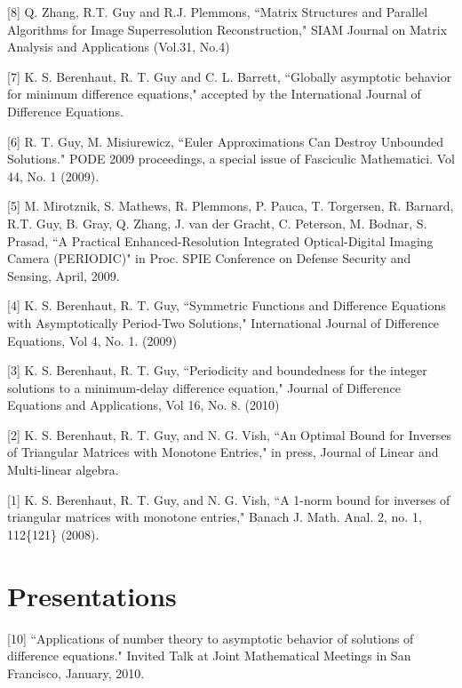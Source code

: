 \documentclass[overlapped,line,letterpaper]{res}
\begin{document}
\begin{resume}


[8] Q. Zhang, R.T. Guy and R.J. Plemmons, ``Matrix Structures and Parallel Algorithms for Image Superresolution Reconstruction," SIAM Journal on Matrix Analysis and Applications (Vol.31, No.4)

[7] K. S. Berenhaut, R. T. Guy and C. L. Barrett, ``Globally asymptotic behavior for minimum difference equations," accepted by the International Journal of Difference Equations.

[6] R. T. Guy, M. Misiurewicz, ``Euler Approximations Can Destroy Unbounded Solutions." PODE 2009 proceedings, a special issue of Fasciculic Mathematici.  Vol 44, No. 1 (2009).

[5] M. Mirotznik, S. Mathews, R. Plemmons, P. Pauca, T. Torgersen, R. Barnard, R.T. Guy, B. Gray, Q. Zhang, J. van der Gracht, C. Peterson, M. Bodnar, S. Prasad, ``A Practical Enhanced-Resolution Integrated Optical-Digital Imaging Camera (PERIODIC)" in Proc. SPIE Conference on Defense Security and Sensing, April, 2009.

[4] K. S. Berenhaut, R. T. Guy, ``Symmetric Functions and Difference Equations with Asymptotically Period-Two Solutions," International Journal of Difference Equations, Vol 4, No. 1. (2009)

[3] K. S. Berenhaut, R. T. Guy, ``Periodicity and boundedness for the integer solutions to a minimum-delay
difference equation," Journal of Difference Equations and Applications, Vol 16, No. 8.  (2010)

[2] K. S. Berenhaut, R. T. Guy, and N. G. Vish, ``An Optimal Bound for Inverses of Triangular Matrices with Monotone Entries," in press, Journal of Linear and Multi-linear algebra.

[1] K. S. Berenhaut, R. T. Guy, and N. G. Vish, ``A 1-norm bound for inverses of triangular matrices
with monotone entries," Banach J. Math. Anal. 2, no. 1, 112\{121\}  (2008).



\section{\bf Presentations}
%
[10] ``Applications of number theory to asymptotic behavior of solutions of difference equations."  Invited Talk at Joint Mathematical Meetings in San Francisco, January, 2010.


\end{resume}
\end{document}
